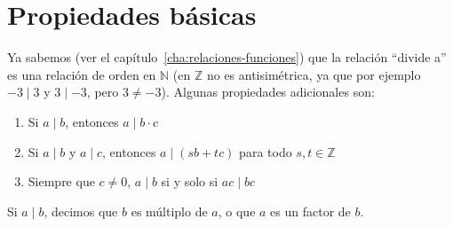 \section{Propiedades básicas}
\label{sec:propiedades-basicas}

  Ya sabemos
  (ver el capítulo~\ref{cha:relaciones-funciones})
  que la relación ``divide a'' es una relación de orden en \(\mathbb{N}\)%
  (en \(\mathbb{Z}\) no es antisimétrica,
   ya que por ejemplo \(-3 \mid 3\) y \(3 \mid -3\),
   pero \(3 \ne -3\)).
  Algunas propiedades adicionales son:
  \begin{enumerate}
  \item
    Si \(a \mid b\),
    entonces \(a \mid b \cdot c\)
  \item
    Si \(a \mid b\) y \(a \mid c\),
    entonces \(a \mid (s b + t c)\)
    para todo \(s, t \in \mathbb{Z}\)
  \item
    Siempre que \(c \ne 0\),
    \(a \mid b\) si y solo si \(a c \mid b c\)
  \end{enumerate}
  Si \(a \mid b\),
  decimos que \(b\) es múltiplo de \(a\),
  o que \(a\) es un factor de \(b\).

